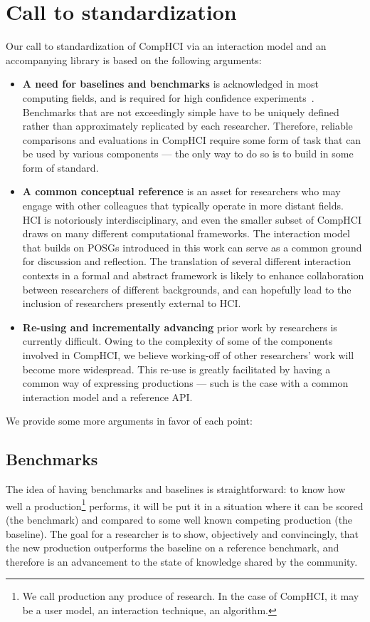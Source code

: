 \documentclass[12pt,a4paper]{article}
\begin{document}
\section{Call to standardization}
Our call to standardization of CompHCI via an interaction model and an accompanying library is based on the following arguments:
	\begin{itemize}
	\item \textbf{A need for baselines and benchmarks} is acknowledged in most computing fields, and is required for high confidence experiments~\cite{rendle2019}. Benchmarks that are not exceedingly simple have to be uniquely defined rather than approximately replicated by each researcher. Therefore, reliable comparisons and evaluations in CompHCI require some form of task that can be used by various components --- the only way to do so is to build in some form of standard.
	
	\item \textbf{A common conceptual reference} is an asset for researchers who may engage with other colleagues that typically operate in more distant fields. HCI is notoriously interdisciplinary, and even the smaller subset of CompHCI draws on many different computational frameworks. The interaction model that builds on POSGs introduced in this work can serve as a common ground for discussion and reflection. The translation of several different interaction contexts in a formal and abstract framework is likely to enhance collaboration between researchers of different backgrounds, and can hopefully lead to the inclusion of researchers presently external to HCI.
	
	\item \textbf{Re-using and incrementally advancing} prior work by researchers is currently difficult. Owing to the complexity of some of the components involved in CompHCI, we believe working-off of other researchers' work will become more widespread. This re-use is greatly facilitated by having a common way of expressing productions --- such is the case with a common interaction model and a reference API.
	\end{itemize}


We provide some more arguments in favor of each point:




\subsection{Benchmarks}
The idea of having benchmarks and baselines is straightforward: to know how well a production\footnote{We call production any produce of research. In the case of CompHCI, it may be a user model, an interaction technique, an algorithm.} performs, it will be put it in a situation where it can be scored (the benchmark) and compared to some well known competing production (the baseline). The goal for a researcher is to show, objectively and convincingly, that the new production outperforms the baseline on a reference benchmark, and therefore is an advancement to the state of knowledge shared by the community. 
\end{document}
